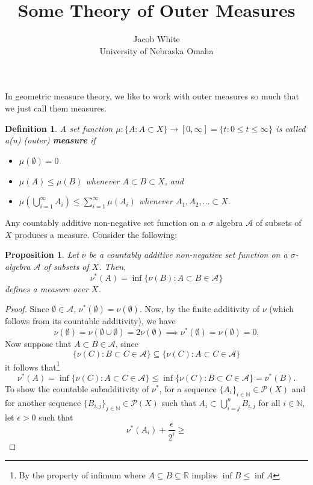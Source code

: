 \documentclass[10pt]{article}
\title{\textbf{Some Theory of Outer Measures}}
\date{}
\author{Jacob White \\ University of Nebraska Omaha}
\theoremstyle{plain}
\newtheorem{definition}{Definition}
\newtheorem{proposition}{Proposition}
\begin{document}
	\maketitle 
	
In geometric measure theory, we like to work with outer measures so much that we just call them measures. 
	\begin{definition}
		A set function $\mu: \{A : A \subset X\} \to [0, \infty] = \{t : 0 \leq t \leq \infty\}$ is called a(n) (outer) \textbf{\textit{measure}} if
			\begin{itemize}
				\item[(1)] $\mu(\emptyset) = 0$
				
				\item[(2)] $\mu(A) \leq \mu(B)$ whenever $A \subset B \subset X$, and
				
				\item[(3)] $\displaystyle{\mu\left(\bigcup_{i = 1}^\infty A_i\right) \leq \sum_{i = 1}^\infty \mu(A_i)}$ whenever $A_1, A_2, \dots \subset X$.  
			\end{itemize}
	\end{definition}
	
Any countably additive non-negative set function on a $\sigma$ algebra $\mathcal{A}$ of subsets of $X$ produces a measure. Consider the following:
	
	\begin{proposition}
		Let $\nu$ be a countably additive non-negative set function on a $\sigma$-algebra $\mathcal{A}$ of subsets of $X$. Then, \begin{equation}\nu^\ast(A) = \inf \{\nu(B) : A \subset B \in \mathcal{A}\}\end{equation} defines a measure over $X$. 
	\end{proposition} 
		\begin{proof}
			Since $\emptyset \in \mathcal{A}$, $\nu^\ast(\emptyset) = \nu(\emptyset)$. Now, by the finite additivity of $\nu$ (which follows from its countable additivity), we have $$\nu(\emptyset) = \nu(\emptyset \cup \emptyset) = 2 \nu(\emptyset) \implies \nu^\ast(\emptyset) = \nu(\emptyset) = 0.$$ Now suppose that $A \subset B  \in \mathcal{A}$, since $$\{\nu(C) : B \subset C  \in \mathcal{A}\} \subseteq \{\nu(C) : A \subset C \in \mathcal{A}\}$$ it follows that\footnote{By the property of infimum where $A \subseteq B \subseteq \mathbb{R}$ implies $\inf B \leq \inf A$} $$\nu^\ast(A) = \inf \{\nu(C) : A \subset C  \in \mathcal{A}\} \leq \inf \{\nu(C) : B \subset C  \in \mathcal{A}\} = \nu^\ast(B).$$  To show the countable subadditivity of $\nu^\ast$, for a sequence $\{A_i\}_{i \in \mathbb{N}} \in \mathcal{P}(X)$ and for another sequence $\{B_{i, j}\}_{j \in \mathbb{N}} \in \mathcal{P}(X)$ such that $A_i \subset \bigcup_{i = j}^{n} B_{i, j}$ for all $i \in \mathbb{N}$, let $\epsilon > 0$ such that $$\nu^\ast(A_i) + \frac{\epsilon}{2^i} \geq $$
		\end{proof}
	
\end{document}
